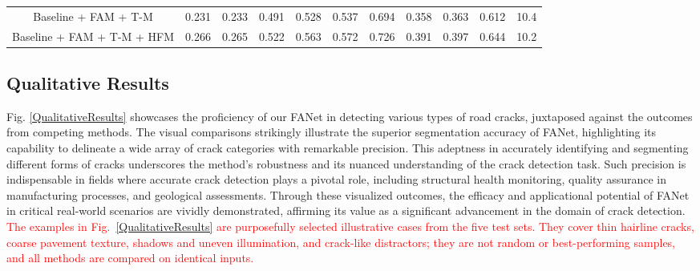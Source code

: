 \documentclass[journal]{IEEEtran}
\begin{document}
\begin{table}[!t]
\begin{tabular}{@{}c|ccc|ccc|ccc|c@{}}
Baseline + FAM + T-M              & 0.231                        & 0.233                        & 0.491                        & 0.528                        & 0.537                        & 0.694                        & 0.358                        & 0.363                        & 0.612                        & 10.4                           \\
Baseline + FAM + T-M + HFM        & {\color[HTML]{FE0000} 0.266} & {\color[HTML]{FE0000} 0.265} & {\color[HTML]{FE0000} 0.522} & {\color[HTML]{FE0000} 0.563} & {\color[HTML]{FE0000} 0.572} & {\color[HTML]{FE0000} 0.726} & {\color[HTML]{FE0000} 0.391} & {\color[HTML]{FE0000} 0.397} & {\color[HTML]{FE0000} 0.644} & 10.2    \\ \bottomrule
\end{tabular}
\label{abla}
\end{table}





\subsection{Qualitative Results} \label{sec:Qualitative-Results}
Fig. \ref{QualitativeResults} showcases the proficiency of our FANet in detecting various types of road cracks, juxtaposed against the outcomes from competing methods. The visual comparisons strikingly illustrate the superior segmentation accuracy of FANet, highlighting its capability to delineate a wide array of crack categories with remarkable precision. This adeptness in accurately identifying and segmenting different forms of cracks underscores the method's robustness and its nuanced understanding of the crack detection task. Such precision is indispensable in fields where accurate crack detection plays a pivotal role, including structural health monitoring, quality assurance in manufacturing processes, and geological assessments. Through these visualized outcomes, the efficacy and applicational potential of FANet in critical real-world scenarios are vividly demonstrated, affirming its value as a significant advancement in the domain of crack detection.
\textcolor{red}{The examples in Fig.~\ref{QualitativeResults} are purposefully selected illustrative cases from the five test sets. They cover thin hairline cracks, coarse pavement texture, shadows and uneven illumination, and crack-like distractors; they are not random or best-performing samples, and all methods are compared on identical inputs.}
\end{document}
